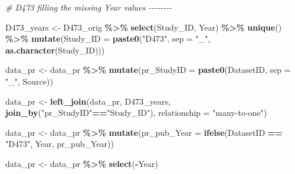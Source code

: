 \documentclass[
]{article}
\newenvironment{Shaded}{\begin{snugshade}}{\end{snugshade}}
\newcommand{\AttributeTok}[1]{\textcolor[rgb]{0.13,0.29,0.53}{#1}}
\newcommand{\CommentTok}[1]{\textcolor[rgb]{0.56,0.35,0.01}{\textit{#1}}}
\newcommand{\FunctionTok}[1]{\textcolor[rgb]{0.13,0.29,0.53}{\textbf{#1}}}
\newcommand{\NormalTok}[1]{#1}
\newcommand{\OtherTok}[1]{\textcolor[rgb]{0.56,0.35,0.01}{#1}}
\newcommand{\SpecialCharTok}[1]{\textcolor[rgb]{0.81,0.36,0.00}{\textbf{#1}}}
\newcommand{\StringTok}[1]{\textcolor[rgb]{0.31,0.60,0.02}{#1}}
\begin{document}
\begin{Shaded}
\begin{Highlighting}[]
\CommentTok{\# D473 filling the missing Year values {-}{-}{-}{-}{-}{-}{-}{-}}

\NormalTok{D473\_years }\OtherTok{\textless{}{-}} 
\NormalTok{  D473\_orig }\SpecialCharTok{\%\textgreater{}\%} 
  \FunctionTok{select}\NormalTok{(Study\_ID, Year) }\SpecialCharTok{\%\textgreater{}\%} 
  \FunctionTok{unique}\NormalTok{() }\SpecialCharTok{\%\textgreater{}\%} 
  \FunctionTok{mutate}\NormalTok{(}\AttributeTok{Study\_ID =} \FunctionTok{paste0}\NormalTok{(}\StringTok{"D473"}\NormalTok{, }\AttributeTok{sep =} \StringTok{"\_"}\NormalTok{, }\FunctionTok{as.character}\NormalTok{(Study\_ID)))}

\NormalTok{data\_pr }\OtherTok{\textless{}{-}} 
\NormalTok{data\_pr }\SpecialCharTok{\%\textgreater{}\%} 
  \FunctionTok{mutate}\NormalTok{(}\AttributeTok{pr\_StudyID =} \FunctionTok{paste0}\NormalTok{(DatasetID, }\AttributeTok{sep =} \StringTok{"\_"}\NormalTok{, Source))}

\NormalTok{data\_pr }\OtherTok{\textless{}{-}}   
  \FunctionTok{left\_join}\NormalTok{(data\_pr, D473\_years, }\FunctionTok{join\_by}\NormalTok{(}\StringTok{"pr\_StudyID"}\SpecialCharTok{==}\StringTok{"Study\_ID"}\NormalTok{), }\AttributeTok{relationship =} \StringTok{"many{-}to{-}one"}\NormalTok{) }


\NormalTok{data\_pr }\OtherTok{\textless{}{-}} 
\NormalTok{  data\_pr }\SpecialCharTok{\%\textgreater{}\%} 
  \FunctionTok{mutate}\NormalTok{(}\AttributeTok{pr\_pub\_Year =} \FunctionTok{ifelse}\NormalTok{(DatasetID }\SpecialCharTok{==} \StringTok{"D473"}\NormalTok{, Year, pr\_pub\_Year))}


\NormalTok{data\_pr }\OtherTok{\textless{}{-}} 
\NormalTok{ data\_pr }\SpecialCharTok{\%\textgreater{}\%} 
   \FunctionTok{select}\NormalTok{(}\SpecialCharTok{{-}}\NormalTok{Year)}
\end{Highlighting}
\end{Shaded}
\end{document}
